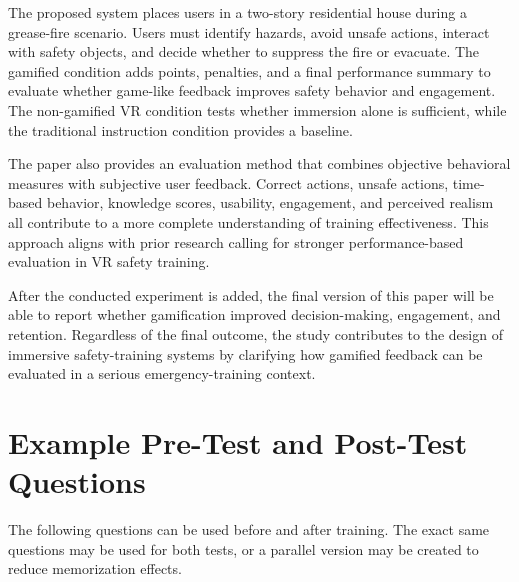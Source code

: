 \documentclass[manuscript, review]{acmart}
\begin{document}
{The proposed system places users in a two-story residential house during a grease-fire scenario. Users must identify hazards, avoid unsafe actions, interact with safety objects, and decide whether to suppress the fire or evacuate. The gamified condition adds points, penalties, and a final performance summary to evaluate whether game-like feedback improves safety behavior and engagement. The non-gamified VR condition tests whether immersion alone is sufficient, while the traditional instruction condition provides a baseline.

The paper also provides an evaluation method that combines objective behavioral measures with subjective user feedback. Correct actions, unsafe actions, time-based behavior, knowledge scores, usability, engagement, and perceived realism all contribute to a more complete understanding of training effectiveness. This approach aligns with prior research calling for stronger performance-based evaluation in VR safety training.

After the conducted experiment is added, the final version of this paper will be able to report whether gamification improved decision-making, engagement, and retention. Regardless of the final outcome, the study contributes to the design of immersive safety-training systems by clarifying how gamified feedback can be evaluated in a serious emergency-training context.

\nocite{*}



\appendix

\section{Example Pre-Test and Post-Test Questions}
\label{app:questions}

The following questions can be used before and after training. The exact same questions may be used for both tests, or a parallel version may be created to reduce memorization effects.

}
\end{document}
